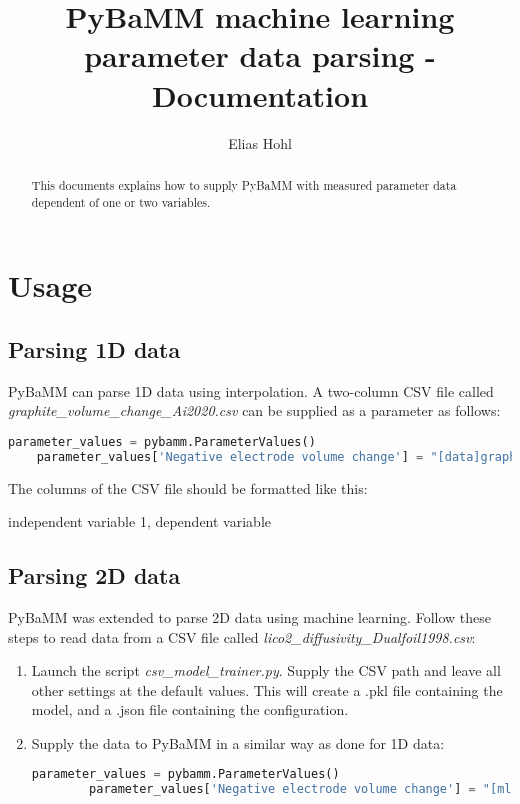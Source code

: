 \documentclass[]{report}
\title{PyBaMM machine learning parameter data parsing - Documentation}
\author{Elias Hohl}
\begin{document}
\maketitle

\begin{abstract}
	This documents explains how to supply PyBaMM with measured parameter data dependent of one or two variables.
\end{abstract}

\section{Usage}

\subsection{Parsing 1D data}

PyBaMM can parse 1D data using interpolation. A two-column CSV file called \textit{graphite\_volume\_change\_Ai2020.csv} can be supplied as a parameter as follows:

\begin{lstlisting}[language=python]
	parameter_values = pybamm.ParameterValues()
	parameter_values['Negative electrode volume change'] = "[data]graphite_volume_change_Ai2020"
\end{lstlisting}

The columns of the CSV file should be formatted like this:

\begin{python}
independent variable 1, dependent variable
\end{python}

\subsection{Parsing 2D data}

PyBaMM was extended to parse 2D data using machine learning. Follow these steps to read data from a CSV file called \textit{lico2\_diffusivity\_Dualfoil1998.csv}:

\begin{enumerate}
\item Launch the script \textit{csv\_model\_trainer.py}. Supply the CSV path and leave all other settings at the default values. This will create a .pkl file containing the model, and a .json file containing the configuration.
\item Supply the data to PyBaMM in a similar way as done for 1D data:
	\begin{lstlisting}[language=python]
		parameter_values = pybamm.ParameterValues()
		parameter_values['Negative electrode volume change'] = "[ml data]lico2_diffusivity_Dualfoil1998"
	\end{lstlisting}
\end{enumerate}
\end{document}
